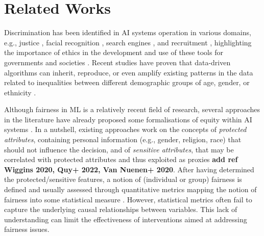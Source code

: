 \documentclass[letterpaper]{article} %
\begin{document}
\section{Related Works}

Discrimination has been identified in AI systems operation in various domains, e.g., justice \cite{ProPublica2}, facial recognition \cite{pmlr-v81-buolamwini18a}, search engines \cite{10.1145/2702123.2702520}, and recruitment \cite{Leicht-Deobald}, highlighting the importance of ethics in the development and use of these tools for governments and societies \cite{act1964civil}.
Recent studies have proven that data-driven algorithms can inherit, reproduce, or even amplify existing patterns in the data related to inequalities between different demographic groups of age, gender, or ethnicity \cite{chouldechova2018frontiers,10.1145/2090236.2090255}. 

Although fairness in ML \cite{Barocas2018FairnessAM} is a relatively recent field of research, several approaches in the literature have already proposed some formalisations of equity within AI systems \cite{wang2022brief,10.1145/3494672}.
%
In a nutshell, existing approaches work on the concepts of \emph{protected attributes}, containing personal information (e.g., gender, religion, race) that should not influence the decision, and of \emph{sensitive attributes}, that may be correlated with protected attributes and thus exploited as proxies \textbf{add ref Wiggins 2020, Quy+ 2022, Van Nuenen+ 2020}.
%
After having determined the protected/sensitive features, a notion of (individual or group) fairness is defined and usually assessed through quantitative metrics mapping the notion of fairness into some statistical measure \cite[e.g., disparate impact, equal opportunity; see][for further details]{wang2022brief}. However, statistical metrics often fail to capture the underlying causal relationships between variables. 
This lack of understanding can limit the effectiveness of interventions aimed at addressing fairness issues. 
\end{document}
